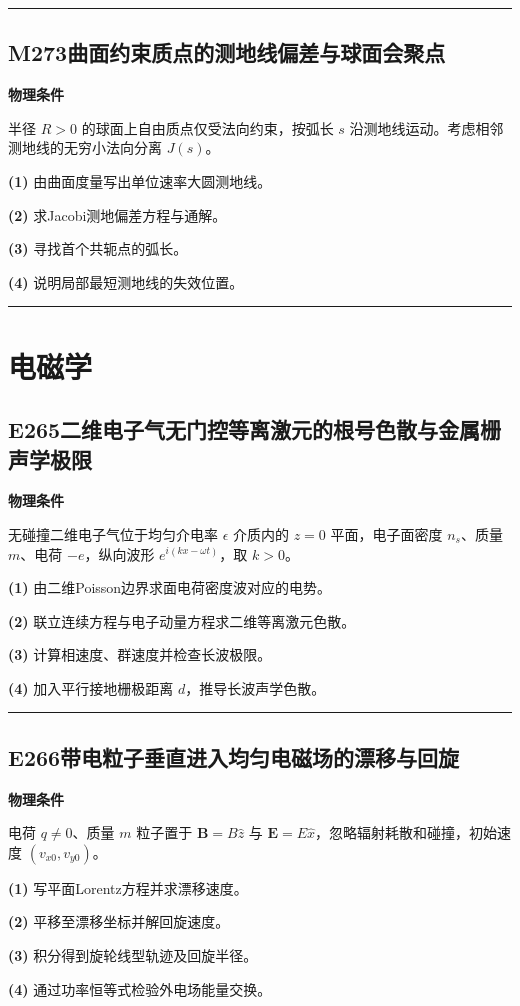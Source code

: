 \documentclass[UTF8,a4paper,11pt,oneside,openany]{ctexbook}
\begin{document}
\par\bigskip\hrule\bigskip
\section*{M273\quad 曲面约束质点的测地线偏差与球面会聚点}
\textbf{物理条件}\par 半径 \(R>0\) 的球面上自由质点仅受法向约束，按弧长 \(s\) 沿测地线运动。考虑相邻测地线的无穷小法向分离 \(J(s)\)。
\par\noindent\textbf{(1)} 由曲面度量写出单位速率大圆测地线。
\par\noindent\textbf{(2)} 求Jacobi测地偏差方程与通解。
\par\noindent\textbf{(3)} 寻找首个共轭点的弧长。
\par\noindent\textbf{(4)} 说明局部最短测地线的失效位置。

\par\bigskip\hrule\bigskip
\chapter{电磁学}
\section*{E265\quad 二维电子气无门控等离激元的根号色散与金属栅声学极限}
\textbf{物理条件}\par 无碰撞二维电子气位于均匀介电率 \(\epsilon\) 介质内的 \(z=0\) 平面，电子面密度 \(n_s\)、质量 \(m\)、电荷 \(-e\)，纵向波形 \(e^{i(kx-\omega t)}\)，取 \(k>0\)。
\par\noindent\textbf{(1)} 由二维Poisson边界求面电荷密度波对应的电势。
\par\noindent\textbf{(2)} 联立连续方程与电子动量方程求二维等离激元色散。
\par\noindent\textbf{(3)} 计算相速度、群速度并检查长波极限。
\par\noindent\textbf{(4)} 加入平行接地栅极距离 \(d\)，推导长波声学色散。

\par\bigskip\hrule\bigskip
\section*{E266\quad 带电粒子垂直进入均匀电磁场的漂移与回旋}
\textbf{物理条件}\par 电荷 \(q\ne0\)、质量 \(m\) 粒子置于 \(\boldsymbol B=B\hat z\) 与 \(\boldsymbol E=E\hat x\)，忽略辐射耗散和碰撞，初始速度 \((v_{x0},v_{y0})\)。
\par\noindent\textbf{(1)} 写平面Lorentz方程并求漂移速度。
\par\noindent\textbf{(2)} 平移至漂移坐标并解回旋速度。
\par\noindent\textbf{(3)} 积分得到旋轮线型轨迹及回旋半径。
\par\noindent\textbf{(4)} 通过功率恒等式检验外电场能量交换。
\end{document}
